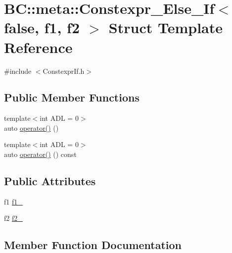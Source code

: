 \hypertarget{structBC_1_1meta_1_1Constexpr__Else__If_3_01false_00_01f1_00_01f2_01_4}{}\section{BC\+:\+:meta\+:\+:Constexpr\+\_\+\+Else\+\_\+\+If$<$ false, f1, f2 $>$ Struct Template Reference}
\label{structBC_1_1meta_1_1Constexpr__Else__If_3_01false_00_01f1_00_01f2_01_4}


{\ttfamily \#include $<$Constexpr\+If.\+h$>$}

\subsection*{Public Member Functions}
\begin{DoxyCompactItemize}
\item 
{\footnotesize template$<$int A\+DL = 0$>$ }\\auto \hyperlink{structBC_1_1meta_1_1Constexpr__Else__If_3_01false_00_01f1_00_01f2_01_4_af05edb2d827e5f49809b8261b715608f}{operator()} ()
\item 
{\footnotesize template$<$int A\+DL = 0$>$ }\\auto \hyperlink{structBC_1_1meta_1_1Constexpr__Else__If_3_01false_00_01f1_00_01f2_01_4_a99cbe5887d14a5c138b3406e57d32568}{operator()} () const 
\end{DoxyCompactItemize}
\subsection*{Public Attributes}
\begin{DoxyCompactItemize}
\item 
f1 \hyperlink{structBC_1_1meta_1_1Constexpr__Else__If_3_01false_00_01f1_00_01f2_01_4_aa07717e0096e5b422ca535581b8eeb25}{f1\+\_\+}
\item 
f2 \hyperlink{structBC_1_1meta_1_1Constexpr__Else__If_3_01false_00_01f1_00_01f2_01_4_a206f4404b1b22229044e5b92b676c7d0}{f2\+\_\+}
\end{DoxyCompactItemize}


\subsection{Member Function Documentation}
